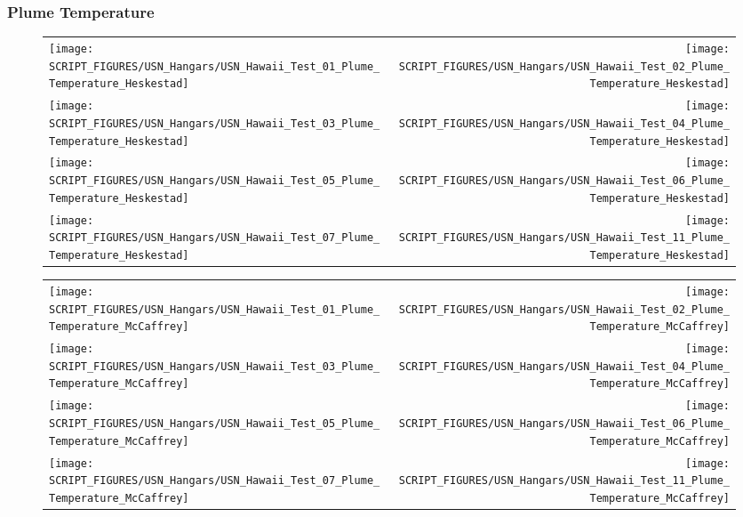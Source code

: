 \subsubsection{Plume Temperature}

\begin{figure}[!ht]
\begin{tabular*}{\textwidth}{l@{\extracolsep{\fill}}r}
\texttt{[image: SCRIPT\_FIGURES/USN\_Hangars/USN\_Hawaii\_Test\_01\_Plume\_Temperature\_Heskestad]} &
\texttt{[image: SCRIPT\_FIGURES/USN\_Hangars/USN\_Hawaii\_Test\_02\_Plume\_Temperature\_Heskestad]} \\
\texttt{[image: SCRIPT\_FIGURES/USN\_Hangars/USN\_Hawaii\_Test\_03\_Plume\_Temperature\_Heskestad]} &
\texttt{[image: SCRIPT\_FIGURES/USN\_Hangars/USN\_Hawaii\_Test\_04\_Plume\_Temperature\_Heskestad]} \\
\texttt{[image: SCRIPT\_FIGURES/USN\_Hangars/USN\_Hawaii\_Test\_05\_Plume\_Temperature\_Heskestad]} &
\texttt{[image: SCRIPT\_FIGURES/USN\_Hangars/USN\_Hawaii\_Test\_06\_Plume\_Temperature\_Heskestad]} \\
\texttt{[image: SCRIPT\_FIGURES/USN\_Hangars/USN\_Hawaii\_Test\_07\_Plume\_Temperature\_Heskestad]} &
\texttt{[image: SCRIPT\_FIGURES/USN\_Hangars/USN\_Hawaii\_Test\_11\_Plume\_Temperature\_Heskestad]}
\end{tabular*}
\end{figure}

\begin{figure}[!ht]
\begin{tabular*}{\textwidth}{l@{\extracolsep{\fill}}r}
\texttt{[image: SCRIPT\_FIGURES/USN\_Hangars/USN\_Hawaii\_Test\_01\_Plume\_Temperature\_McCaffrey]} &
\texttt{[image: SCRIPT\_FIGURES/USN\_Hangars/USN\_Hawaii\_Test\_02\_Plume\_Temperature\_McCaffrey]} \\
\texttt{[image: SCRIPT\_FIGURES/USN\_Hangars/USN\_Hawaii\_Test\_03\_Plume\_Temperature\_McCaffrey]} &
\texttt{[image: SCRIPT\_FIGURES/USN\_Hangars/USN\_Hawaii\_Test\_04\_Plume\_Temperature\_McCaffrey]} \\
\texttt{[image: SCRIPT\_FIGURES/USN\_Hangars/USN\_Hawaii\_Test\_05\_Plume\_Temperature\_McCaffrey]} &
\texttt{[image: SCRIPT\_FIGURES/USN\_Hangars/USN\_Hawaii\_Test\_06\_Plume\_Temperature\_McCaffrey]} \\
\texttt{[image: SCRIPT\_FIGURES/USN\_Hangars/USN\_Hawaii\_Test\_07\_Plume\_Temperature\_McCaffrey]} &
\texttt{[image: SCRIPT\_FIGURES/USN\_Hangars/USN\_Hawaii\_Test\_11\_Plume\_Temperature\_McCaffrey]}
\end{tabular*}
\end{figure}

